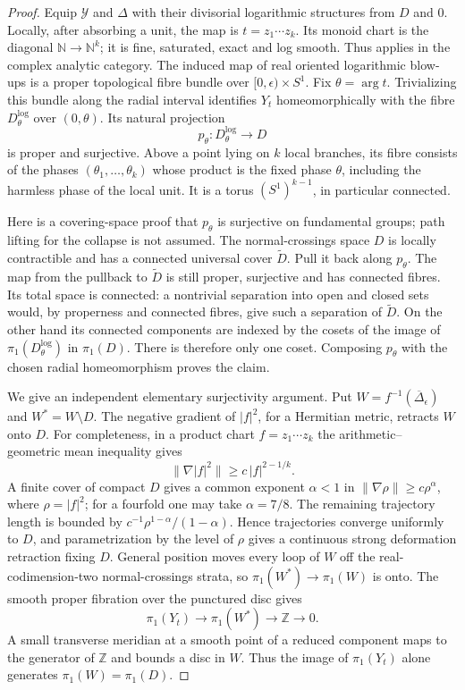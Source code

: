 \begin{proof}
Equip $\mathcal Y$ and $\Delta$ with
their divisorial logarithmic structures
from $D$ and $0$. Locally, after
absorbing a unit, the map is
$t=z_1\cdots z_k$. Its monoid chart
is the diagonal
$\mathbb N\to\mathbb N^k$; it is
fine, saturated, exact and log smooth.
Thus \cite[Theorem 5.1, p.2226]{NO10}
applies in the complex analytic
category. The induced map of real
oriented logarithmic blow-ups is a
proper topological fibre bundle over
$[0,\epsilon)\times S^1$.
Fix $\theta=\arg t$. Trivializing
this bundle along the radial interval
identifies $Y_t$ homeomorphically with
the fibre $D^{\log}_\theta$ over
$(0,\theta)$. Its natural projection
\[
 p_\theta:D^{\log}_\theta\longrightarrow D
\]
is proper and surjective. Above a
point lying on $k$ local branches,
its fibre consists of the phases
$(\theta_1,\ldots,\theta_k)$ whose
product is the fixed phase $\theta$,
including the harmless phase of the
local unit. It is a torus
$(S^1)^{k-1}$, in particular connected.

Here is a covering-space proof that
$p_\theta$ is surjective on fundamental
groups; path lifting for the collapse
is not assumed. The normal-crossings
space $D$ is locally contractible
and has a connected universal cover
$\widetilde D$. Pull it back along
$p_\theta$. The map from the pullback
to $\widetilde D$ is still proper,
surjective and has connected fibres.
Its total space is connected: a
nontrivial separation into open and
closed sets would, by properness and
connected fibres, give such a
separation of $\widetilde D$.
On the other hand its connected
components are indexed by the cosets
of the image of
$\pi_1(D^{\log}_\theta)$ in $\pi_1(D)$.
There is therefore only one coset.
Composing $p_\theta$ with the chosen
radial homeomorphism proves the claim.

We give an independent elementary
surjectivity argument. Put
$W=f^{-1}(\overline\Delta_\epsilon)$
and $W^*=W\setminus D$. The negative
gradient of $|f|^2$, for a Hermitian
metric, retracts $W$ onto $D$.
For completeness, in a product chart
$f=z_1\cdots z_k$ the arithmetic--
geometric mean inequality gives
\[
 \|\nabla |f|^2\|
   \ge c\,|f|^{2-1/k}.
\]
A finite cover of compact $D$ gives
a common exponent $\alpha<1$ in
$\|\nabla\rho\|\ge c\rho^\alpha$,
where $\rho=|f|^2$; for a fourfold
one may take $\alpha=7/8$.
The remaining trajectory length is
bounded by
$c^{-1}\rho^{1-\alpha}/(1-\alpha)$.
Hence trajectories converge uniformly
to $D$, and parametrization by the
level of $\rho$ gives a continuous
strong deformation retraction fixing
$D$. General position moves every
loop of $W$ off the real-codimension-two
normal-crossings strata, so
$\pi_1(W^*)\to\pi_1(W)$ is onto.
The smooth proper fibration over the
punctured disc gives
\[
 \pi_1(Y_t)\longrightarrow\pi_1(W^*)
       \longrightarrow\mathbb Z\longrightarrow0.
\]
A small transverse meridian at a
smooth point of a reduced component
maps to the generator of $\mathbb Z$
and bounds a disc in $W$.
Thus the image of $\pi_1(Y_t)$ alone
generates $\pi_1(W)=\pi_1(D)$.


\end{proof}
